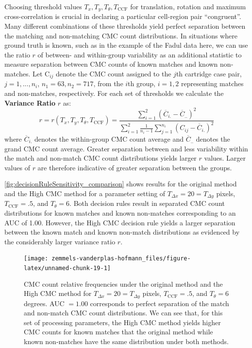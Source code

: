 Choosing threshold values \(T_x, T_y, T_\theta, T_{\text{CCF}}\) for
translation, rotation and maximum cross-correlation is crucial in
declaring a particular cell-region pair ``congruent''. Many different
combinations of these thresholds yield perfect separation between the
matching and non-matching CMC count distributions. In situations where
ground truth is known, such as in the example of the Fadul data here, we
can use the ratio \(r\) of between- and within-group variability as an
additional statistic to measure separation between CMC counts of known
matches and known non-matches. Let C\(_{ij}\) denote the CMC count
assigned to the \(j\)th cartridge case pair, \(j = 1,...,n_i\),
\(n_1 = 63, n_2 = 717\), from the \(i\)th group, \(i = 1,2\)
representing matches and non-matches, respectively. For each set of
thresholds we calculate the \textbf{Variance Ratio} \(r\) as: \[
r = r\left(T_x, T_y, T_\theta, T_{\text{CCF}}\right) = \frac{\sum_{i=1}^2 \left(\overline{C}_{i.} - \overline{C}_{..}\right)^2}{\sum_{i=1}^2 \frac{1}{n_i - 1}\sum_{j=1}^{n_i} \left(C_{ij} - \overline{C}_{i.}\right)^2}
\] where \(\overline{C}_{i.}\) denotes the within-group CMC count
average and \(\overline{C}_{..}\) denotes the grand CMC count average.
Greater separation between and less variability within the match and
non-match CMC count distributions yields larger \(r\) values. Larger
values of \(r\) are therefore indicative of greater separation between
the groups.

\autoref{fig:decisionRuleSensitivity_comparison} shows results for the
original method and the High CMC method for a parameter setting of
\(T_{\Delta x} = 20 = T_{\Delta y}\) pixels, \(T_{\text{CCF}} = .5\),
and \(T_{\theta} = 6\). Both decision rules result in separated CMC
count distributions for known matches and known non-matches
corresponding to an AUC of 1.00. However, the High CMC decision rule
yields a larger separation between the known match and known non-match
distributions as evidenced by the considerably larger variance ratio
\(r\).

\begin{Schunk}
\begin{figure}[htbp]

\texttt{[image: zemmels-vanderplas-hofmann\_files/figure-latex/unnamed-chunk-19-1]} \hfill{}

\caption{\label{fig:decisionRuleSensitivity_comparison} CMC count relative frequencies under the original method and the High CMC method for $T_{\Delta x} = 20 = T_{\Delta y}$ pixels, $T_{\text{CCF}} = .5$, and $T_{\theta} = 6$ degrees. AUC $= 1.00$ corresponds to perfect separation of the match and non-match CMC count distributions. We can see that, for this set of processing parameters, the High CMC method yields higher CMC counts for known matches that the original method while known non-matches have the same distribution under both methods.}\label{fig:unnamed-chunk-19}
\end{figure}
\end{Schunk}


